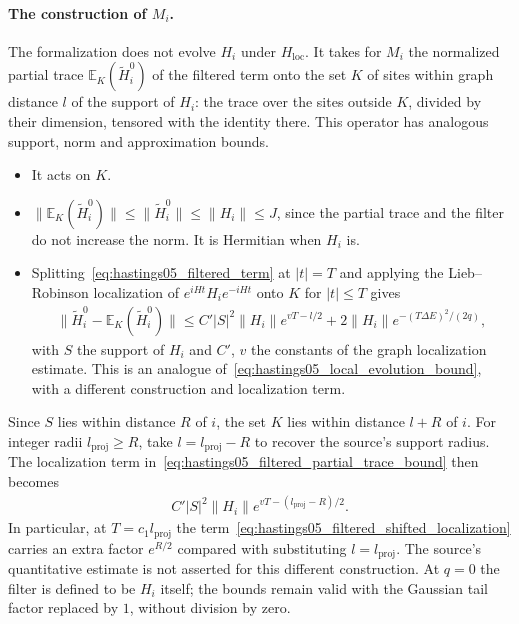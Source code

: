 \documentclass{article}
\begin{document}
\paragraph{The construction of $M_i$.} The formalization does not evolve $H_i$
under $H_{\mathrm{loc}}$. It takes for $M_i$ the normalized partial trace
$\mathbb E_K(\tilde H_i^0)$ of the filtered term onto the set $K$ of sites
within graph distance $l$ of the support of $H_i$: the trace over the sites
outside $K$, divided by their dimension, tensored with the identity there.
This operator has analogous support, norm and approximation bounds.
\begin{itemize}
  \item It acts on $K$.
  \item $\lVert\mathbb E_K(\tilde H_i^0)\rVert\le\lVert\tilde H_i^0\rVert
    \le\lVert H_i\rVert\le J$, since the partial trace and the filter do not
    increase the norm. It is Hermitian when $H_i$ is.
  \item Splitting~\eqref{eq:hastings05_filtered_term} at $|t|=T$ and applying
    the Lieb--Robinson localization of $e^{iHt}H_ie^{-iHt}$ onto $K$ for
    $|t|\le T$ gives
    \begin{align}
      \lVert\tilde H_i^0-\mathbb E_K(\tilde H_i^0)\rVert
      \le C'|S|^2\lVert H_i\rVert e^{vT-l/2}
      +2\lVert H_i\rVert e^{-(T\Delta E)^2/(2q)},
      \label{eq:hastings05_filtered_partial_trace_bound}
    \end{align}
    with $S$ the support of $H_i$ and $C'$, $v$ the constants of the graph
    localization estimate. This is an analogue
    of~\eqref{eq:hastings05_local_evolution_bound}, with a different construction and localization term.
\end{itemize}

Since $S$ lies within distance $R$ of $i$, the set $K$ lies within distance
$l+R$ of $i$. For integer radii $l_{\mathrm{proj}}\ge R$, take
$l=l_{\mathrm{proj}}-R$ to recover the source's support radius. The
localization term in~\eqref{eq:hastings05_filtered_partial_trace_bound}
then becomes
\begin{align}
  C'|S|^2\lVert H_i\rVert e^{vT-(l_{\mathrm{proj}}-R)/2}.
  \label{eq:hastings05_filtered_shifted_localization}
\end{align}
In particular, at $T=c_1l_{\mathrm{proj}}$ the
term~\eqref{eq:hastings05_filtered_shifted_localization} carries an extra factor
$e^{R/2}$ compared with substituting $l=l_{\mathrm{proj}}$. The source's
quantitative estimate is not asserted for this different construction.
At $q=0$ the filter is defined to be $H_i$ itself; the bounds remain valid
with the Gaussian tail factor replaced by $1$, without division by zero.
\end{document}
